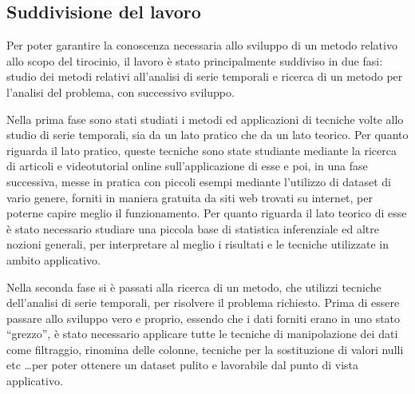\subsection{Suddivisione del lavoro}
Per poter garantire la conoscenza necessaria allo sviluppo di un metodo relativo allo scopo
del tirocinio, il lavoro è stato principalmente suddiviso in due fasi: studio dei metodi
relativi all'analisi di serie temporali e ricerca di un metodo per l'analisi
del problema, con successivo sviluppo.

Nella prima fase sono stati studiati i metodi ed applicazioni di tecniche volte allo studio
di serie temporali, sia da un lato pratico che da un lato teorico. Per quanto riguarda il lato 
pratico, queste tecniche sono state studiante mediante la ricerca di articoli e videotutorial online
sull'applicazione di esse e poi, in una fase successiva, messe in pratica con piccoli esempi 
mediante l'utilizzo di dataset di vario genere, forniti in maniera gratuita da siti web trovati 
su internet, per poterne capire meglio il funzionamento.
Per quanto riguarda il lato teorico di esse è stato necessario studiare una piccola base di statistica
inferenziale ed altre nozioni generali, per interpretare al meglio i risultati e le tecniche utilizzate in 
ambito applicativo.

Nella seconda fase si è passati alla ricerca di un metodo, che utilizzi 
tecniche dell'analisi di serie temporali, per risolvere il problema richiesto.
Prima di essere passare allo sviluppo vero e proprio, 
essendo che i dati forniti erano in uno stato ``grezzo'', è stato 
necessario applicare tutte le tecniche di manipolazione dei dati come filtraggio, 
rinomina delle colonne, tecniche per la sostituzione di valori nulli etc \dots per poter 
ottenere un dataset pulito e lavorabile dal punto di vista applicativo. 